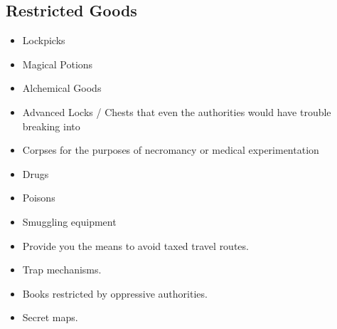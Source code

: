\begin{multicols}{2}
\section{Restricted Goods} 
\begin{itemize}
    \item Lockpicks
    \item Magical Potions
    \item Alchemical Goods
    \item Advanced Locks / Chests that even the authorities would have trouble breaking into
    \item Corpses for the purposes of necromancy or medical experimentation
    \item Drugs
    \item Poisons
    \item Smuggling equipment
    \item Provide you the means to avoid taxed travel routes.
    \item Trap mechanisms.
    \item Books restricted by oppressive authorities.
    \item Secret maps.
\end{itemize}


\end{multicols}

